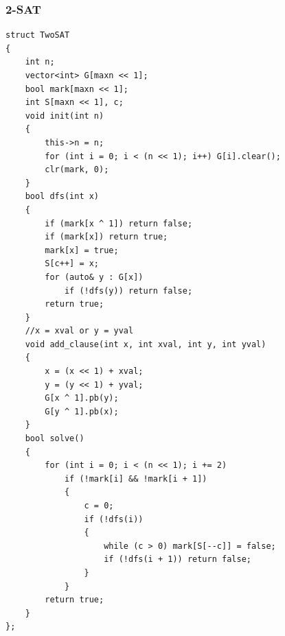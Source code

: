\documentclass[twoside]{article}
\begin{document}
\subsubsection{2-SAT}
\begin{lstlisting}
struct TwoSAT
{
    int n;
    vector<int> G[maxn << 1];
    bool mark[maxn << 1];
    int S[maxn << 1], c;
    void init(int n)
    {
        this->n = n;
        for (int i = 0; i < (n << 1); i++) G[i].clear();
        clr(mark, 0);
    }
    bool dfs(int x)
    {
        if (mark[x ^ 1]) return false;
        if (mark[x]) return true;
        mark[x] = true;
        S[c++] = x;
        for (auto& y : G[x])
            if (!dfs(y)) return false;
        return true;
    }
    //x = xval or y = yval
    void add_clause(int x, int xval, int y, int yval)
    {
        x = (x << 1) + xval;
        y = (y << 1) + yval;
        G[x ^ 1].pb(y);
        G[y ^ 1].pb(x);
    }
    bool solve()
    {
        for (int i = 0; i < (n << 1); i += 2)
            if (!mark[i] && !mark[i + 1])
            {
                c = 0;
                if (!dfs(i))
                {
                    while (c > 0) mark[S[--c]] = false;
                    if (!dfs(i + 1)) return false;
                }
            }
        return true;
    }
};
\end{lstlisting}
\end{document}
